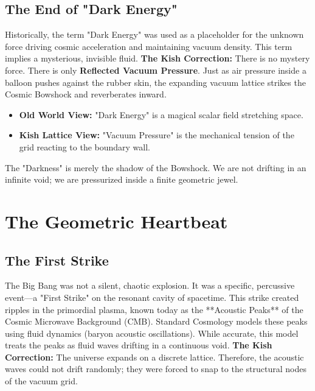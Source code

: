 \documentclass[11pt, letterpaper, openany]{book}
\begin{document}
\section{The End of "Dark Energy"}
Historically, the term "Dark Energy" was used as a placeholder for the unknown force driving cosmic acceleration and maintaining vacuum density. This term implies a mysterious, invisible fluid.
\textbf{The Kish Correction:} There is no mystery force. There is only \textbf{Reflected Vacuum Pressure}.
Just as air pressure inside a balloon pushes against the rubber skin, the expanding vacuum lattice strikes the Cosmic Bowshock and reverberates inward.
\begin{itemize}
    \item \textbf{Old World View:} "Dark Energy" is a magical scalar field stretching space.
    \item \textbf{Kish Lattice View:} "Vacuum Pressure" is the mechanical tension of the grid reacting to the boundary wall.
\end{itemize}
The "Darkness" is merely the shadow of the Bowshock. We are not drifting in an infinite void; we are pressurized inside a finite geometric jewel.


\chapter{The Geometric Heartbeat}
\label{chap:cmb_resonance}

\section{The First Strike}
The Big Bang was not a silent, chaotic explosion. It was a specific, percussive event---a "First Strike" on the resonant cavity of spacetime.
This strike created ripples in the primordial plasma, known today as the **Acoustic Peaks** of the Cosmic Microwave Background (CMB).
Standard Cosmology models these peaks using fluid dynamics (baryon acoustic oscillations). While accurate, this model treats the peaks as fluid waves drifting in a continuous void.
\textbf{The Kish Correction:} The universe expands on a discrete lattice. Therefore, the acoustic waves could not drift randomly; they were forced to snap to the structural nodes of the vacuum grid.
\end{document}
